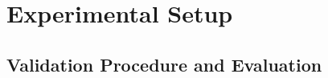 \documentclass[letterpaper]{article}
\begin{document}



\section{Experimental Setup}
\label{sec:experimental setup}




\subsection{Validation Procedure and Evaluation}
\label{sec:bipartite validation}
\end{document}
